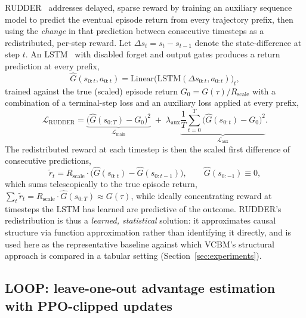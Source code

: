 RUDDER~\cite{arjonaibarra2019rudder} addresses delayed, sparse reward by training an auxiliary sequence model to predict the eventual episode return from every trajectory prefix, then using the \emph{change} in that prediction between consecutive timesteps as a redistributed, per-step reward. Let $\Delta s_t = s_t - s_{t-1}$ denote the state-difference at step $t$. An LSTM~\cite{hochreiter1997lstm} with disabled forget and output gates produces a return prediction at every prefix,
\begin{equation}
  \hat{G}(s_{0:t}, a_{0:t}) = \mathrm{Linear}\big(\mathrm{LSTM}(\Delta s_{0:t}, a_{0:t})\big)_t ,
  \label{eq:rudder-lstm}
\end{equation}
trained against the true (scaled) episode return $G_0 = G(\tau) / R_{\mathrm{scale}}$ with a combination of a terminal-step loss and an auxiliary loss applied at every prefix,
\begin{equation}
  \mathcal{L}_{\mathrm{RUDDER}} = \underbrace{\big(\hat{G}(s_{0:T}) - G_0\big)^2}_{\mathcal{L}_{\mathrm{main}}} \;+\; \lambda_{\mathrm{aux}} \underbrace{\frac{1}{T}\sum_{t=0}^{T} \big(\hat{G}(s_{0:t}) - G_0\big)^2}_{\mathcal{L}_{\mathrm{aux}}} .
  \label{eq:rudder-loss}
\end{equation}
The redistributed reward at each timestep is then the scaled first difference of consecutive predictions,
\begin{equation}
  \tilde{r}_t = R_{\mathrm{scale}} \cdot \big(\hat{G}(s_{0:t}) - \hat{G}(s_{0:t-1})\big), \qquad \hat{G}(s_{0:-1}) \equiv 0 ,
  \label{eq:rudder-redistribution}
\end{equation}
which sums telescopically to the true episode return, $\sum_t \tilde{r}_t = R_{\mathrm{scale}} \cdot \hat{G}(s_{0:T}) \approx G(\tau)$, while ideally concentrating reward at timesteps the LSTM has learned are predictive of the outcome. RUDDER's redistribution is thus a \emph{learned, statistical} solution: it approximates causal structure via function approximation rather than identifying it directly, and is used here as the representative baseline against which VCBM's structural approach is compared in a tabular setting (Section~\ref{sec:experiments}).

\subsection{LOOP: leave-one-out advantage estimation with PPO-clipped updates}
\label{sec:prelim-loop}

